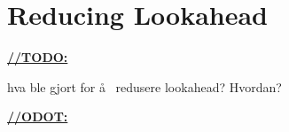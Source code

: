 \section{Reducing Lookahead}
\underline{\textbf{\LARGE //TODO:}}

hva ble gjort for \aa~ redusere lookahead? Hvordan?

\underline{\textbf{\LARGE //ODOT:}} 